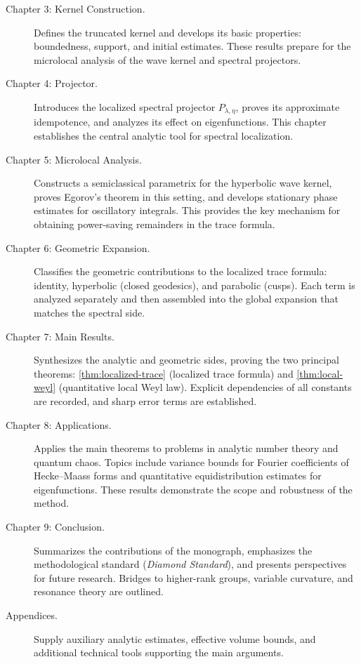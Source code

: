 \begin{description}
  \item[Chapter 3: Kernel Construction.] 
  Defines the truncated kernel and develops its basic properties:
  boundedness, support, and initial estimates. 
  These results prepare for the microlocal analysis 
  of the wave kernel and spectral projectors.

  \item[Chapter 4: Projector.] 
  Introduces the localized spectral projector $P_{\lambda,\eta}$,
  proves its approximate idempotence,
  and analyzes its effect on eigenfunctions.
  This chapter establishes the central analytic tool
  for spectral localization.

  \item[Chapter 5: Microlocal Analysis.] 
  Constructs a semiclassical parametrix for the hyperbolic wave kernel,
  proves Egorov’s theorem in this setting,
  and develops stationary phase estimates for oscillatory integrals.
  This provides the key mechanism for obtaining
  power-saving remainders in the trace formula.

  \item[Chapter 6: Geometric Expansion.] 
  Classifies the geometric contributions to the localized trace formula:
  identity, hyperbolic (closed geodesics), and parabolic (cusps).
  Each term is analyzed separately and then assembled
  into the global expansion that matches the spectral side.

  \item[Chapter 7: Main Results.] 
  Synthesizes the analytic and geometric sides,
  proving the two principal theorems:
  \cref{thm:localized-trace} (localized trace formula)
  and \cref{thm:local-weyl} (quantitative local Weyl law).
  Explicit dependencies of all constants are recorded,
  and sharp error terms are established.

  \item[Chapter 8: Applications.] 
  Applies the main theorems to problems in analytic number theory
  and quantum chaos.
  Topics include variance bounds for Fourier coefficients of
  Hecke–Maass forms and quantitative equidistribution estimates
  for eigenfunctions. These results demonstrate the scope
  and robustness of the method.

  \item[Chapter 9: Conclusion.] 
  Summarizes the contributions of the monograph,
  emphasizes the methodological standard 
  (\emph{Diamond Standard}),
  and presents perspectives for future research.
  Bridges to higher-rank groups, variable curvature,
  and resonance theory are outlined.

  \item[Appendices.] 
  Supply auxiliary analytic estimates, effective volume bounds,
  and additional technical tools supporting the main arguments.
\end{description}

